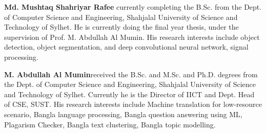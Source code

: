 \documentclass[two column]{ieeeaccess}
\begin{document}
\vspace{-3in}

\begin{IEEEbiography}{\textbf{Md. Mushtaq Shahriyar Rafee}}
currently completing the B.Sc. from the Dept. of Computer Science and Engineering, Shahjalal University of Science and Technology of Sylhet. He is currently doing the final year thesis, under the supervision of Prof. M. Abdullah Al Mumin. His research interests include object detection, object segmentation, and deep convolutional neural network, signal processing.
\end{IEEEbiography}

\vspace{-3in}

\begin{IEEEbiography}{\textbf{M. Abdullah Al Mumin}}received the B.Sc. and M.Sc. and Ph.D. degrees from the Dept. of Computer Science and Engineering, Shahjalal University of Science and Technology of Sylhet. Currently he is the Director of IICT and Dept. Head of CSE, SUST. His research interests include Machine translation for low-resource scenario, Bangla language processing, Bangla question answering using ML, Plagarism Checker, Bangla text clustering, Bangla topic modelling.
\end{IEEEbiography}


\EOD
\end{document}
